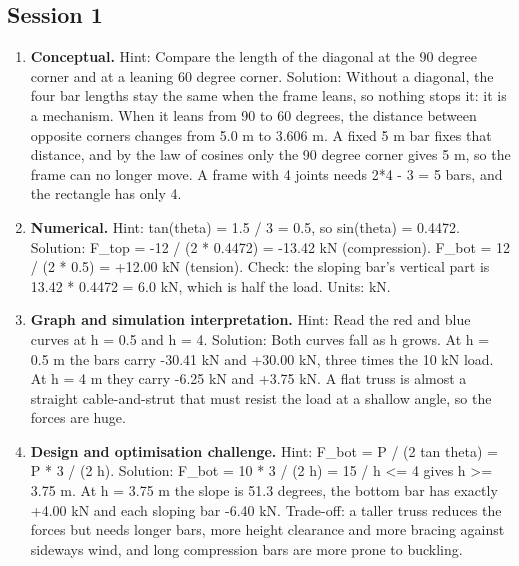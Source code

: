 \documentclass[11pt,a4paper]{article}
\begin{document}
\subsection*{Session 1}
\begin{enumerate}[nosep]
\item \textbf{Conceptual.} Hint: Compare the length of the diagonal at the 90 degree corner and at a leaning 60 degree corner. Solution: Without a diagonal, the four bar lengths stay the same when the frame leans, so nothing stops it: it is a mechanism. When it leans from 90 to 60 degrees, the distance between opposite corners changes from 5.0 m to 3.606 m. A fixed 5 m bar fixes that distance, and by the law of cosines only the 90 degree corner gives 5 m, so the frame can no longer move. A frame with 4 joints needs 2*4 - 3 = 5 bars, and the rectangle has only 4.
\item \textbf{Numerical.} Hint: tan(theta) = 1.5 / 3 = 0.5, so sin(theta) = 0.4472. Solution: F\_top = -12 / (2 * 0.4472) = -13.42 kN (compression). F\_bot = 12 / (2 * 0.5) = +12.00 kN (tension). Check: the sloping bar's vertical part is 13.42 * 0.4472 = 6.0 kN, which is half the load. Units: kN.
\item \textbf{Graph and simulation interpretation.} Hint: Read the red and blue curves at h = 0.5 and h = 4. Solution: Both curves fall as h grows. At h = 0.5 m the bars carry -30.41 kN and +30.00 kN, three times the 10 kN load. At h = 4 m they carry -6.25 kN and +3.75 kN. A flat truss is almost a straight cable-and-strut that must resist the load at a shallow angle, so the forces are huge.
\item \textbf{Design and optimisation challenge.} Hint: F\_bot = P / (2 tan theta) = P * 3 / (2 h). Solution: F\_bot = 10 * 3 / (2 h) = 15 / h \textless{}= 4 gives h \textgreater{}= 3.75 m. At h = 3.75 m the slope is 51.3 degrees, the bottom bar has exactly +4.00 kN and each sloping bar -6.40 kN. Trade-off: a taller truss reduces the forces but needs longer bars, more height clearance and more bracing against sideways wind, and long compression bars are more prone to buckling.
\end{enumerate}
\end{document}

